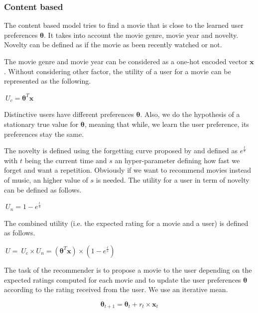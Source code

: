 \documentclass[letterpaper]{article}
\begin{document}
\subsubsection{Content based}

The content based model tries to find a movie that is close to the learned user preferences $\boldsymbol{\theta}$. It takes into account the movie genre, movie year and novelty. Novelty can be defined as if the movie as been recently watched or not.

The movie genre and movie year can be considered as a one-hot encoded vector $\boldsymbol{x}$.
Without considering other factor, the utility of a user for a movie can be represented as the following.

\begin{center}
	$ \ U_{c} = \boldsymbol{\theta}^{T} \boldsymbol{x}$ 
\end{center}

Distinctive users have different preferences $\boldsymbol{\theta}$. Also, we do the hypothesis of a stationary true value for $\boldsymbol{\theta}$, meaning that while, we learn the user preference, its preferences stay the same.

The novelty is defined using the forgetting curve proposed by \cite{ebbinghaus1913memory} and defined as $ e^{\frac{t}{s}} $ with $t$ being the current time and $s$ an hyper-parameter defining how fast we forget and want a repetition. Obviously if we want to recommend movies instead of music, an higher value of $s$ is needed. The utility for a user in term of novelty can be defined as follows.

\begin{center}
	$ \ U_{n} = 1 - e^{\frac{t}{s}} $ 
\end{center}

The combined utility (i.e. the expected rating for a movie and a user) is defined as follows.

\begin{center}
	$ \ U = \ U_{c} \times  U_{n} = (\boldsymbol{\theta}^{T} \boldsymbol{x}) \times (1 - e^{\frac{t}{s}}) $ 
\end{center}

The task of the recommender is to propose a movie to the user depending on the expected ratings computed for each movie and to update the user preferences $\boldsymbol{\theta}$ according to the rating received from the user. We use an iterative mean.

$$ \boldsymbol{\theta}_{t+1} = \boldsymbol{\theta}_{t} + r_{t} \times \boldsymbol{x}_{t} $$
\end{document}

